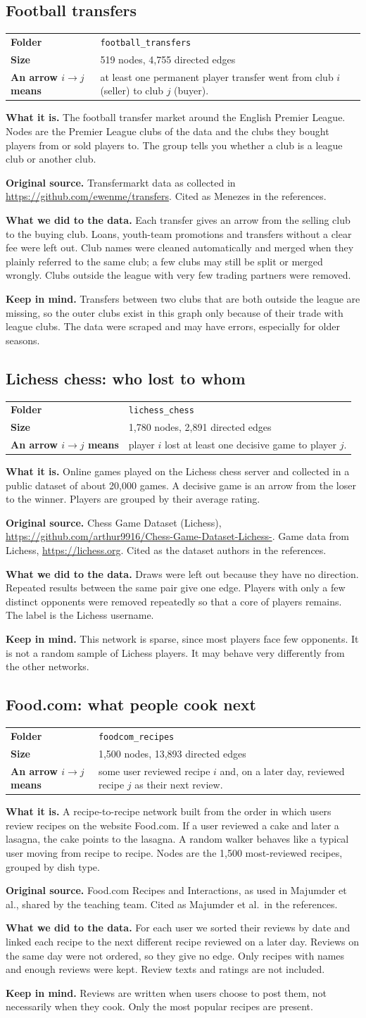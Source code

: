\documentclass[11pt,a4paper]{article}
\makeatletter
\newcommand{\code}[1]{\texttt{#1}}
\newcommand{\dataset}[9]{%
  \subsection{#1}
  \begin{tabularx}{\textwidth}{@{}>{\bfseries}l X@{}}
    Folder & \code{#2}\\
    Size & #3 nodes, #4 directed edges\\
    An arrow $i\to j$ means & #5\\
  \end{tabularx}

  \textbf{What it is.} #6

  \textbf{Original source.} #7

  \textbf{What we did to the data.} #8

  \textbf{Keep in mind.} #9
}
\makeatother
\begin{document}
\dataset{Football transfers}{football\_transfers}{519}{4,755}
{at least one permanent player transfer went from club $i$ (seller) to club $j$ (buyer).}
{The football transfer market around the English Premier League. Nodes are the Premier League clubs of the data and the clubs they bought players from or sold players to. The group tells you whether a club is a league club or another club.}
{Transfermarkt data as collected in \url{https://github.com/ewenme/transfers}. Cited as Menezes in the references.}
{Each transfer gives an arrow from the selling club to the buying club. Loans, youth-team promotions and transfers without a clear fee were left out. Club names were cleaned automatically and merged when they plainly referred to the same club; a few clubs may still be split or merged wrongly. Clubs outside the league with very few trading partners were removed.}
{Transfers between two clubs that are both outside the league are missing, so the outer clubs exist in this graph only because of their trade with league clubs. The data were scraped and may have errors, especially for older seasons.}

\dataset{Lichess chess: who lost to whom}{lichess\_chess}{1,780}{2,891}
{player $i$ lost at least one decisive game to player $j$.}
{Online games played on the Lichess chess server and collected in a public dataset of about 20,000 games. A decisive game is an arrow from the loser to the winner. Players are grouped by their average rating.}
{Chess Game Dataset (Lichess), \url{https://github.com/arthur9916/Chess-Game-Dataset-Lichess-}. Game data from Lichess, \url{https://lichess.org}. Cited as the dataset authors in the references.}
{Draws were left out because they have no direction. Repeated results between the same pair give one edge. Players with only a few distinct opponents were removed repeatedly so that a core of players remains. The label is the Lichess username.}
{This network is sparse, since most players face few opponents. It is not a random sample of Lichess players. It may behave very differently from the other networks.}

\dataset{Food.com: what people cook next}{foodcom\_recipes}{1,500}{13,893}
{some user reviewed recipe $i$ and, on a later day, reviewed recipe $j$ as their next review.}
{A recipe-to-recipe network built from the order in which users review recipes on the website Food.com. If a user reviewed a cake and later a lasagna, the cake points to the lasagna. A random walker behaves like a typical user moving from recipe to recipe. Nodes are the 1,500 most-reviewed recipes, grouped by dish type.}
{Food.com Recipes and Interactions, as used in Majumder et al., shared by the teaching team. Cited as Majumder et al.\ in the references.}
{For each user we sorted their reviews by date and linked each recipe to the next different recipe reviewed on a later day. Reviews on the same day were not ordered, so they give no edge. Only recipes with names and enough reviews were kept. Review texts and ratings are not included.}
{Reviews are written when users choose to post them, not necessarily when they cook. Only the most popular recipes are present.}
\end{document}
